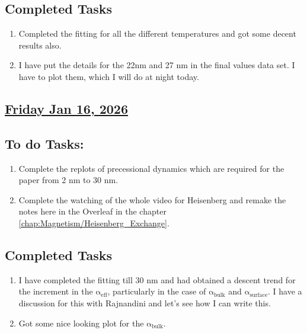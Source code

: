 \subsection*{Completed Tasks}
\begin{enumerate}[\ding{52}]  %
    \item Completed the fitting for all the different temperatures and got some decent results also.
    \item I have put the details for the 22nm and 27 nm in the final values data set. I have to plot them, which I will do at night today. 
\end{enumerate}
\subsection*{\underline{Friday Jan 16, 2026}}
\subsection*{To do Tasks:}
\begin{enumerate}
    \item Complete the replots of precessional dynamics which are required for the paper from 2 nm to 30 nm. \cmark 
    \item Complete the watching of the whole video for Heisenberg and remake the notes here in the Overleaf in the chapter \ref{chap:Magnetism/Heisenberg_Exchange}.
\end{enumerate}
\subsection*{Completed Tasks}
\begin{enumerate}[\ding{52}]  %
    \item I have completed the fitting till 30 nm and had obtained a descent trend for the increment in the $\mathrm{\alpha_{eff}}$, particularly in the case of $\mathrm{\alpha_{bulk}}$ and $\mathrm{\alpha_{surface}}$. I have a discussion for this with Rajnandini and let's see how I can write this.
    \item Got some nice looking plot for the $\mathrm{\alpha_{bulk}}$.

\end{enumerate}
